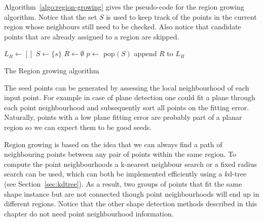 Algorithm~\ref{algo:region-growing} gives the pseudo-code for the region growing algorithm.
Notice that the set $S$ is used to keep track of the points in the current region whose neighbours still need to be checked.
Also notice that candidate points that are already assigned to a region are skipped.
\begin{algorithm}
	
	$L_R \leftarrow [\xspace]$\;
	 {
		$S \leftarrow \{s\}$\;
		$R \leftarrow \emptyset$\;
		{
			$p \leftarrow $ pop$(S)$\;
			{
				 {
				}
			}
		}
		append $R$ to $L_R$\;
	}
	\caption{The Region growing algorithm}
	\label{algo:region-growing}
\end{algorithm}

The seed points can be generated by assessing the local neighbourhood of each input point. 
For example in case of plane detection one could fit a plane through each point neighbourhood and subsequently sort all points on the fitting error. 
Naturally, points with a low plane fitting error are probably part of a planar region so we can expect them to be good seeds.

Region growing is based on the idea that we can always find a path of neighbouring points between any pair of points within the same region.
To compute the point neighbourhoods a k-nearest neighbour search or a fixed radius search can be used, which can both be implemented efficiently using a $k$d-tree (see Section~\ref{sec:kdtree}).
As a result, two groups of points that fit the same shape instance but are not connected though point neighbourhoods will end up in different regions.
Notice that the other shape detection methods described in this chapter do not need point neighbourhood information.




